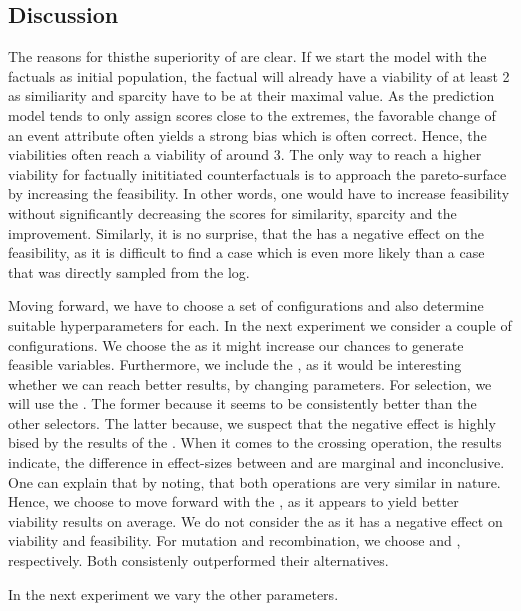 \documentclass[./../../paper.tex]{subfiles}
\begin{document}
\subsection{Discussion}
The reasons for thisthe superiority of  are clear. If we start the model with the factuals as initial population, the factual will already have a viability of at least 2 as similiarity and sparcity have to be at their maximal value. As the prediction model tends to only assign scores close to the extremes, the favorable change of an event attribute often yields a strong bias which is often correct. Hence, the viabilities often reach a viability of around 3. The only way to reach a higher viability for factually inititiated counterfactuals is to approach the pareto-surface by increasing the feasibility. In other words, one would have to increase feasibility without significantly decreasing the scores for similarity, sparcity and the improvement. Similarly, it is no surprise, that the  has a negative effect on the feasibility, as it is difficult to find a case which is even more likely than a case that was directly sampled from the log.

Moving forward, we have to choose a set of configurations and also determine suitable hyperparameters for each. In the next experiment we consider a couple of configurations. We choose the  as it might increase our chances to generate feasible variables. Furthermore, we include the , as it would be interesting whether we can reach better results, by changing parameters. For selection, we will use the . The former because it seems to be consistently better than the other selectors. The latter because, we suspect that the negative effect is highly bised by the results of the . When it comes to the crossing operation, the results indicate, the difference in effect-sizes between  and  are marginal and inconclusive. One can explain that by noting, that both operations are very similar in nature. Hence, we choose to move forward with the , as it appears to yield better viability results on average. We do not consider the  as it has a negative effect on viability and feasibility. For mutation and recombination, we choose  and , respectively. Both consistenly outperformed their alternatives.

In the next experiment we vary the other parameters.
\end{document}
